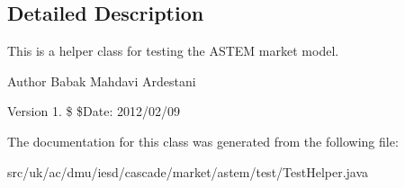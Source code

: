 \subsection{Detailed Description}
This is a helper class for testing the A\-S\-T\-E\-M market model. 

\begin{DoxyAuthor}{Author}
Babak Mahdavi Ardestani 
\end{DoxyAuthor}
\begin{DoxyVersion}{Version}
1. \$ \$\-Date\-: 2012/02/09 
\end{DoxyVersion}


The documentation for this class was generated from the following file\-:\begin{DoxyCompactItemize}
\item 
src/uk/ac/dmu/iesd/cascade/market/astem/test/Test\-Helper.\-java\end{DoxyCompactItemize}
